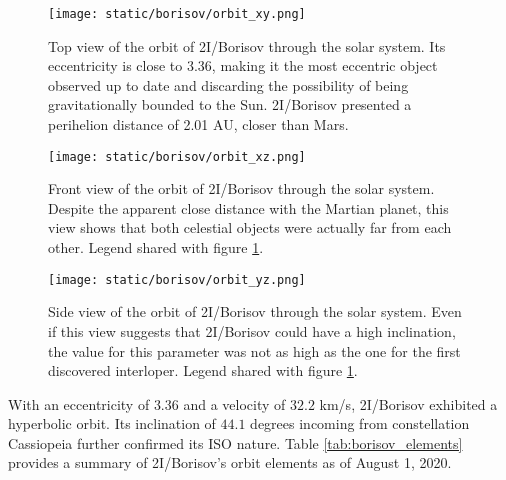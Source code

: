 \begin{figure}[H]
  \centering
  \texttt{[image: static/borisov/orbit\_xy.png]}
  \caption[Top view of the orbit of 2I/Borisov through the solar system]{
    Top view of the orbit of 2I/Borisov through the solar system. Its eccentricity is
    close to 3.36, making it the most eccentric object observed up to date
    and discarding the possibility of being gravitationally bounded to the Sun.
    2I/Borisov presented a perihelion distance of 2.01 AU, closer than Mars.
  }
  \label{fig:borisov_orbit}
\end{figure}


\begin{figure}[H]
  \centering
  \texttt{[image: static/borisov/orbit\_xz.png]}
  \caption[Front view of the orbit of 2I/Borisov through the solar system]{
    Front view of the orbit of 2I/Borisov through the solar system. Despite the
    apparent close distance with the Martian planet, this view shows that both
    celestial objects were actually far from each other. Legend shared with
    figure \ref{fig:borisov_orbit}.}
  \label{fig:borisov_orbit_xz}
\end{figure}

\begin{figure}[H]
  \centering
  \texttt{[image: static/borisov/orbit\_yz.png]}
  \caption[Side view of the orbit of 2I/Borisov through the solar system]{
    Side view of the orbit of 2I/Borisov through the solar system. Even if this
    view suggests that 2I/Borisov could have a high inclination, the value for this
    parameter was not as high as the one for the first discovered interloper.
    Legend shared with figure \ref{fig:borisov_orbit}.
  }
  \label{fig:borisov_orbit_yz}
\end{figure}

With an eccentricity of $3.36$ and a velocity of $32.2$ km/s, 2I/Borisov exhibited
a hyperbolic orbit. Its inclination of $44.1$ degrees incoming from
constellation Cassiopeia further confirmed its ISO nature. Table
\ref{tab:borisov_elements} provides a summary of 2I/Borisov's orbit elements as of
August 1, 2020.

